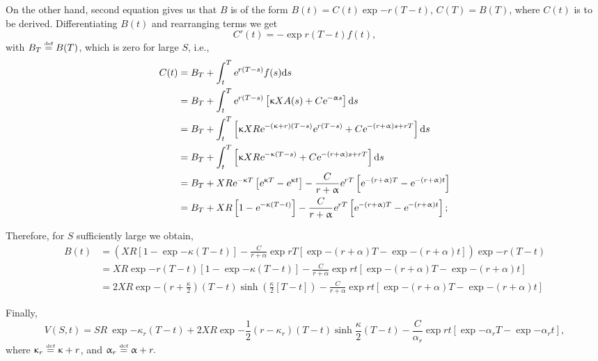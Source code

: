 On the other hand, second equation gives us that $B$ is of the form $B(t) = C(t) \exp{-r (T-t)}$, $C(T) = B(T)$, where $C(t)$ is to be derived. Differentiating $B(t)$ and rearranging terms we get
	\begin{equation}
		C'(t) = - \exp{r(T-t)}f(t), 
	\end{equation}
with $  B_T \overset{\text{\tiny def}}{=} B(T) $, which is zero for large $S$, i.e.,
	$$
		\begin{aligned}
			  C(t) 	&= B_T + \int_t^T \text{\sl e}^{r(T-s)}f(s)\text{\rm d} s\\
					&= B_T + \int_t^T \text{\sl e}^{r(T-s)}\left[\upkappa X A(s) + C\text{\sl e}^{-\upalpha s}\right]\text{\rm d} s\\
					&= B_T + \int_t^T \left[\upkappa X R \text{\sl e}^{- (\upkappa + r) (T-s)} \text{\sl e}^{r(T-s)} + C\text{\sl e}^{-(r+\upalpha)s+rT}\right]\text{\rm d} s\\
					&= B_T + \int_t^T \left[\upkappa X R \text{\sl e}^{-\upkappa (T-s)} + C\text{\sl e}^{-(r+\upalpha)s +rT}\right]\text{\rm d} s\\
					&= B_T + {X R \text{\sl e}^{-\upkappa T}}  \left[\text{\sl e}^{\upkappa T} - \text{\sl e}^{\upkappa t}\right] - \frac{C}{r+\upalpha}\text{\sl e}^{rT}\left[\text{\sl e}^{-(r+\upalpha)T}-\text{\sl e}^{-(r+\upalpha)t}\right]\\
					&= B_T + {X R}  \left[1 -  \text{\sl e}^{-\upkappa(T-t)}\right]- \frac{C}{r+\upalpha}\text{\sl e}^{rT}\left[\text{\sl e}^{-(r+\upalpha)T}-\text{\sl e}^{-(r+\upalpha)t}\right] ;
		\end{aligned}
	$$

Therefore, for $S$ sufficiently large we obtain,
	\begin{equation}
		\begin{aligned}
			B(t) 	&= \left({X R}  \left[1 -  \exp{-\kappa(T-t)}\right]- \frac{C}{r+\alpha}\exp{rT}\left[\exp{-(r+\alpha)T}-\exp{-(r+\alpha)t}\right]\right) \exp{-r(T-t)}\\
					&= {X R\exp{-r(T-t)}} \left[1 -  \exp{- \kappa (T-t)}\right]- \frac{C}{r+\alpha}\exp{rt}\left[\exp{-(r+\alpha)T}-\exp{-(r+\alpha)t}\right]\\
					&= {2X R}\exp{-\left(r+\frac{\kappa}{2}\right)(T-t)}\sinh\left(\frac{\kappa}{2}[T-t]\right)- \frac{C}{r+\alpha}\exp{rt}\left[\exp{-(r+\alpha)T}-\exp{-(r+\alpha)t}\right]
		\end{aligned}
	\end{equation}

Finally,
	\begin{equation}\label{boundary_formula}
		V(S,t) = SR  \ \exp{-\kappa_r(T-t)} +  {2X R}\exp{-\frac{1}{2}\left(r-\kappa_r\right)(T-t)}\sinh \frac{\kappa}{2}(T-t)- \frac{C}{\alpha_r}\exp{rt}\left[\exp{-\alpha_r T}-\exp{-\alpha_r t}\right],
	\end{equation}
	where $\upkappa_r \overset{\text{\tiny def}}{=} \upkappa + r$, and $\upalpha_r \overset{\text{\tiny def}}{=}  \upalpha + r.$
